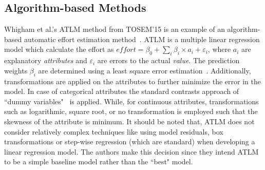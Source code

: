 \documentclass[10pt,conference]{IEEEtran}
\newcommand{\bi}{\begin{itemize}}
\newcommand{\ei}{\end{itemize}}
\begin{document}
\subsection{Algorithm-based Methods}


 Whigham et al.'s ATLM method from TOSEM'15 is an example of an algorithm-based automatic effort estimation method~\cite{Whigham:2015}. ATLM is a multiple linear regression model which calculate the effort as $\mathit{effort} = \beta_0 + \sum_i\beta_i\times a_{i} +  \varepsilon_i$,  where $a_i$ are explanatory {\em attributes} and $\varepsilon_i$ are errors to the actual {\em value}. The prediction weights $\beta_i$ are determined using a least square error estimation~\cite{neter1996applied}. Additionally, transformations are applied on the attributes to further minimize the error in the model. In case of categorical attributes the standard contrasts approach of ``dummy variables"~\cite{hardy1993regression} is applied. While, for continuous attributes, transformations such as logarithmic, square root,  or no transformation is employed such that the skewness of the attribute is minimum. It should be noted that, ATLM does not consider relatively complex techniques like using model residuals,  box transformations or step-wise regression (which are standard) when developing a linear regression model. The authors make this decision since they intend ATLM to be a simple baseline model rather than the ``best" model.
\end{document}
